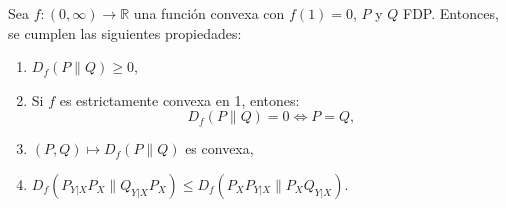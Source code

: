 \begin{theorem}
    Sea $f\colon(0,\infty)\to\mathbb{R}$ una funci\'on convexa con $f(1)=0$, $P$ y $Q$ FDP. Entonces, se cumplen las siguientes propiedades:
    \begin{enumerate}[label=(\alph*)]
        \item $D_f(P\|Q)\geq0$,
        \item Si $f$ es estrictamente convexa en 1, entones:
        \begin{equation*}
            D_f(P\|Q)=0\iff P=Q,
        \end{equation*}
        \item $(P,Q)\mapsto D_f(P\|Q)$ es convexa,
        \item $D_f(P_{Y|X}P_X\|Q_{Y|X}P_X)\leq D_f(P_XP_{Y|X}\|P_XQ_{Y|X})$.
    \end{enumerate}
\end{theorem}
